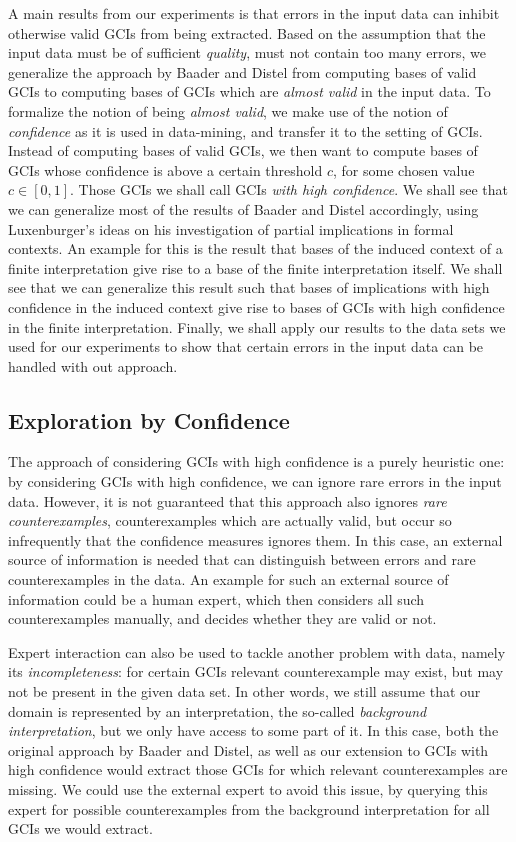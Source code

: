 A main results from our experiments is that errors in the input data can inhibit otherwise
valid GCIs from being extracted.  Based on the assumption that the input data must be of
sufficient \emph{quality}, \ie must not contain too many errors, we generalize the
approach by Baader and Distel from computing bases of valid GCIs to computing bases of
GCIs which are \emph{almost valid} in the input data.  To formalize the notion of being
\emph{almost valid}, we make use of the notion of \emph{confidence} as it is used in
data-mining, and transfer it to the setting of GCIs.  Instead of computing bases of valid
GCIs, we then want to compute bases of GCIs whose confidence is above a certain threshold
$c$, for some chosen value $c \in [0,1]$.  Those GCIs we shall call GCIs \emph{with high
  confidence}.  We shall see that we can generalize most of the results of Baader and
Distel accordingly, using Luxenburger's ideas on his investigation of partial implications
in formal contexts.  An example for this is the result that bases of the induced context
of a finite interpretation give rise to a base of the finite interpretation itself.  We
shall see that we can generalize this result such that bases of implications with high
confidence in the induced context give rise to bases of GCIs with high confidence in the
finite interpretation.  Finally, we shall apply our results to the data sets we used for
our experiments to show that certain errors in the input data can be handled with out
approach.

\subsection{Exploration by Confidence}
\label{sec:expl-conf-2}

The approach of considering GCIs with high confidence is a purely heuristic one: by
considering GCIs with high confidence, we can ignore rare errors in the input data.
However, it is not guaranteed that this approach also ignores \emph{rare counterexamples},
\ie counterexamples which are actually valid, but occur so infrequently that the
confidence measures ignores them.  In this case, an external source of information is
needed that can distinguish between errors and rare counterexamples in the data.  An
example for such an external source of information could be a human expert, which then
considers all such counterexamples manually, and decides whether they are valid or not.

Expert interaction can also be used to tackle another problem with data, namely its
\emph{incompleteness}: for certain GCIs relevant counterexample may exist, but may not be
present in the given data set.  In other words, we still assume that our domain is
represented by an interpretation, the so-called \emph{background interpretation}, but we
only have access to some part of it.  In this case, both the original approach by Baader
and Distel, as well as our extension to GCIs with high confidence would extract those GCIs
for which relevant counterexamples are missing.  We could use the external expert to avoid
this issue, by querying this expert for possible counterexamples from the background
interpretation for all GCIs we would extract.

